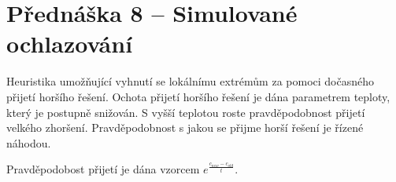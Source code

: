 \section{Přednáška 8 -- Simulované ochlazování}

Heuristika umožňující vyhnutí se lokálnímu extrémům za pomoci dočasného přijetí horšího řešení.
Ochota přijetí horšího řešení je dána parametrem teploty, který je postupně snižován.
S vyšší teplotou roste pravděpodobnost přijetí velkého zhoršení.
Pravděpodobnost s jakou se přijme horší řešení je řízené náhodou.

Pravděpodobost přijetí je dána vzorcem $e^{\frac{c_{new} - c_{old}}{t}}$.
